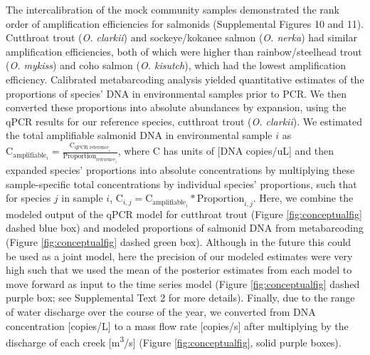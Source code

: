 \documentclass[
]{article}
\begin{document}
The intercalibration of the mock community samples demonstrated the rank
order of amplification efficiencies for salmonids (Supplemental Figures
10 and 11). Cutthroat trout (\emph{O. clarkii}) and sockeye/kokanee
salmon (\emph{O. nerka}) had similar amplification efficiencies, both of
which were higher than rainbow/steelhead trout (\emph{O. mykiss}) and
coho salmon (\emph{O. kisutch}), which had the lowest amplification
efficiency. Calibrated metabarcoding analysis yielded quantitative
estimates of the proportions of species' DNA in environmental samples
prior to PCR. We then converted these proportions into absolute
abundances by expansion, using the qPCR results for our reference
species, cutthroat trout (\emph{O. clarkii}). We estimated the total
amplifiable salmonid DNA in environmental sample \(i\) as
\(\text{C}_{\text{amplifiable}_{i}} = \frac{\text{C}_{\text{qPCR reference}_{i}}}{\text{Proportion}_{\text{reference}_{i}}}\),
where C has units of {[}DNA copies/uL{]} and then expanded species'
proportions into absolute concentrations by multiplying these
sample-specific total concentrations by individual species' proportions,
such that for species \(j\) in sample \(i\),
\(\text{C}_{i,j} = \text{C}_{\text{amplifiable}_{i}} * \text{Proportion}_{i,j}\).
Here, we combine the modeled output of the qPCR model for cutthroat
trout (Figure \ref{fig:conceptualfig} dashed blue box) and modeled
proportions of salmonid DNA from metabarcoding (Figure
\ref{fig:conceptualfig} dashed green box). Although in the future this
could be used as a joint model, here the precision of our modeled
estimates were very high such that we used the mean of the posterior
estimates from each model to move forward as input to the time series
model (Figure \ref{fig:conceptualfig} dashed purple box; see
Supplemental Text 2 for more details). Finally, due to the range of
water discharge over the course of the year, we converted from DNA
concentration {[}copies/L{]} to a mass flow rate {[}copies/s{]} after
multiplying by the discharge of each creek {[}m\textsuperscript{3}/s{]}
(Figure \ref{fig:conceptualfig}, solid purple boxes).
\end{document}
